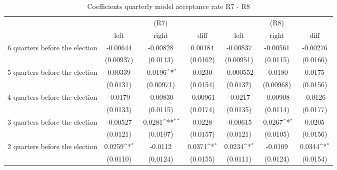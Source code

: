 \begin{table}[!ht]\centering \footnotesize
\def\sym#1{\ifmmode^{#1}\else\(^{#1}\)\fi}
\caption{Coefficients quarterly model acceptance rate R7 - R8}
\begin{tabular}{l*{6}{c}}
\hline\hline
                    &\multicolumn{3}{c}{(R7)}&\multicolumn{3}{c}{(R8)}\\
&\multicolumn{1}{c}{left}&\multicolumn{1}{c}{right}&\multicolumn{1}{c}{diff}&\multicolumn{1}{c}{left}&\multicolumn{1}{c}{right}&\multicolumn{1}{c}{diff}\\
\hline
 6 quarters before the election&    -0.00644         &    -0.00828         &     0.00184         &    -0.00837         &    -0.00561         &    -0.00276         \\
                    &   (0.00937)         &    (0.0113)         &    (0.0162)         &   (0.00951)         &    (0.0115)         &    (0.0166)         \\
[0,5em]
 5 quarters before the election&     0.00339         &     -0.0196\sym{*}  &      0.0230         &   -0.000552         &     -0.0180         &      0.0175         \\
                    &    (0.0131)         &   (0.00971)         &    (0.0154)         &    (0.0132)         &   (0.00968)         &    (0.0156)         \\
[0,5em]
 4 quarters before the election&     -0.0179         &    -0.00830         &    -0.00961         &     -0.0217         &    -0.00908         &     -0.0126         \\
                    &    (0.0133)         &    (0.0115)         &    (0.0174)         &    (0.0135)         &    (0.0114)         &    (0.0177)         \\
[0,5em]
 3 quarters before the election&    -0.00527         &     -0.0281\sym{**} &      0.0228         &    -0.00615         &     -0.0267\sym{*}  &      0.0205         \\
                    &    (0.0121)         &    (0.0107)         &    (0.0157)         &    (0.0121)         &    (0.0105)         &    (0.0156)         \\
[0,5em]
 2 quarters before the election&      0.0259\sym{*}  &     -0.0112         &      0.0371\sym{*}  &      0.0234\sym{*}  &     -0.0109         &      0.0344\sym{*}  \\
                    &    (0.0110)         &    (0.0124)         &    (0.0155)         &    (0.0111)         &    (0.0124)         &    (0.0154)         \\

\end{tabular}
\end{table}
